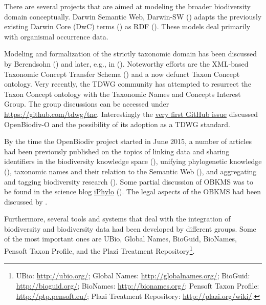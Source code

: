 There are several projects that are aimed at modeling the broader biodiversity domain conceptually. Darwin Semantic Web, Darwin-SW (\cite{baskauf_darwin-sw:_2016}) adapts the previously existing Darwin Core (DwC) terms (\cite{wieczorek_darwin_2012}) as RDF (\cite{rdf_working_group_resource_2014}). These models deal primarily with organismal occurrence data.

Modeling and formalization of the strictly taxonomic domain has been discussed by Berendsohn (\cite{berendsohn_concept_1995}) and later, e.g., in (\cite{franz_perspectives:_2009,sterner_taxonomy_2017}). Noteworthy efforts are the XML-based Taxonomic Concept Transfer Schema (\cite{taxonomic_names_and_concepts_interest_group_taxonomic_2006}) and a now defunct Taxon Concept ontology. Very recently, the TDWG community has attempted to resurrect the Taxon Concept ontology with the Taxonomic Names and Concepts Interest Group. The group discussions can be accessed under \url{https://github.com/tdwg/tnc}. Interestingly the \href{https://github.com/tdwg/tnc/issues/1}{very first GitHub issue} discussed OpenBiodiv-O and the possibility of its adoption as a TDWG standard.

By the time the OpenBiodiv project started in June 2015, a number of articles had been previously published on the topics of linking data and sharing identifiers in the biodiversity knowledge space (\cite{page_biodiversity_2008}), unifying phylogenetic knowledge (\cite{parr_evolutionary_2012}), taxonomic names and their relation to the Semantic Web (\cite{page_taxonomic_2006,patterson_names_2010}), and aggregating and tagging biodiversity research (\cite{mindell_aggregating_2011}). Some partial discussion of OBKMS was to be found in the science blog \href{http://iphylo.blogspot.bg}{iPhylo} (\cite{page_vision_2014, page_putting_2015}). The legal aspects of the OBKMS had been discussed by \cite{egloff_open_2014}.

Furthermore, several tools and systems that deal with the integration of biodiversity and biodiversity data had been developed by different groups. Some of the most important ones are UBio, Global Names, BioGuid, BioNames, Pensoft Taxon Profile, and the Plazi Treatment Repository\footnote{UBio: \href{http://ubio.org/}{http://ubio.org/}; Global Names: \href{http://globalnames.org/}{http://globalnames.org/}; BioGuid: \href{http://bioguid.org/}{http://bioguid.org/}; BioNames: \href{http://bionames.org/}{http://bionames.org/}; Pensoft Taxon Profile: \href{http://ptp.pensoft.eu/}{http://ptp.pensoft.eu/}; Plazi Treatment Repository: \href{http://plazi.org/wiki/}{http://plazi.org/wiki/}.}.

